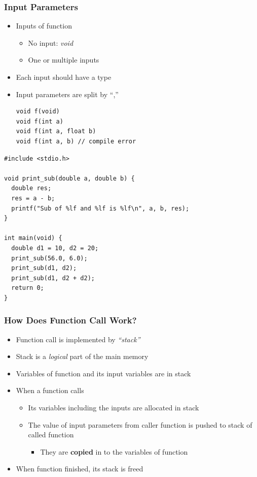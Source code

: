 \documentclass{../c-lecture}
\begin{document}
\begin{frame}[fragile]
  \frametitle{Input Parameters}
  \begin{itemize}
    \item Inputs of function
    \begin{itemize}
      \item No input: \textit{\color{YellowOrange} void}
      \item One or multiple inputs
    \end{itemize}
    \item Each input should have a type
    \item Input parameters are split by ``,''
    \begin{verbatim}
void f(void)
void f(int a)
void f(int a, float b)
void f(int a, b) // compile error
    \end{verbatim}
  \end{itemize}
\end{frame}

\begin{frame}[fragile]
  \begin{verbatim}
#include <stdio.h>

void print_sub(double a, double b) {
  double res;
  res = a - b;
  printf("Sub of %lf and %lf is %lf\n", a, b, res);
}

int main(void) {
  double d1 = 10, d2 = 20;
  print_sub(56.0, 6.0);
  print_sub(d1, d2);
  print_sub(d1, d2 + d2);
  return 0;
}
  \end{verbatim}
\end{frame}

\begin{frame}
  \frametitle{How Does Function Call Work?}
  \begin{itemize}
    \item
      Function call is implemented by \textit{\color{YellowOrange} ``stack''}
    \item
      Stack is a \textit{\color{LimeGreen} logical} part of the main memory
    \item Variables of function and its input variables are in stack
    \item When a function calls
    \begin{itemize}
      \item Its variables including the inputs are allocated in stack
      \item
        The value of input parameters from caller function is pushed to stack of
        called function
      \begin{itemize}
        \item
          They are \textbf{\color{Cyan} copied} in to the variables of
          function
      \end{itemize}
    \end{itemize}
    \item When function finished, its stack is freed
  \end{itemize}
\end{frame}
\end{document}
